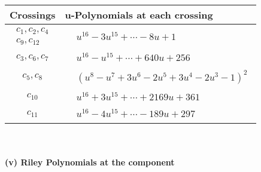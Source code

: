 \documentclass[1p]{elsarticle_modified}
\theoremstyle{definition}
\begin{document}
\begin{tabular}{m{50pt}|m{274pt}}
Crossings & \hspace{64pt}u-Polynomials at each crossing \\
\hline $$\begin{aligned}c_{1},c_{2},c_{4}\\c_{9},c_{12}\end{aligned}$$&$\begin{aligned}
&u^{16}-3 u^{15}+\cdots-8 u+1
\end{aligned}$\\
\hline $$\begin{aligned}c_{3},c_{6},c_{7}\end{aligned}$$&$\begin{aligned}
&u^{16}- u^{15}+\cdots+640 u+256
\end{aligned}$\\
\hline $$\begin{aligned}c_{5},c_{8}\end{aligned}$$&$\begin{aligned}
&(u^8- u^7+3 u^6-2 u^5+3 u^4-2 u^3-1)^2
\end{aligned}$\\
\hline $$\begin{aligned}c_{10}\end{aligned}$$&$\begin{aligned}
&u^{16}+3 u^{15}+\cdots+2169 u+361
\end{aligned}$\\
\hline $$\begin{aligned}c_{11}\end{aligned}$$&$\begin{aligned}
&u^{16}-4 u^{15}+\cdots-189 u+297
\end{aligned}$\\
\hline
\end{tabular}\\~\\
\newpage\renewcommand{\arraystretch}{1}
\flushleft \textbf{(v) Riley Polynomials at the component}\newline \\
\end{document}
